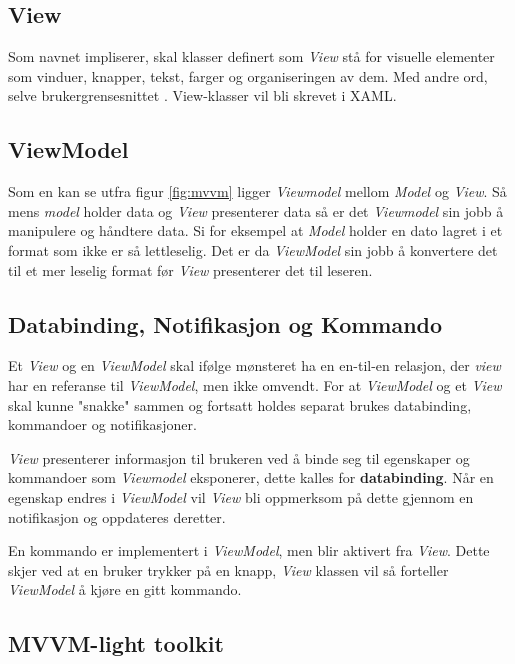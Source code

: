 \subsection{View}
 
 Som navnet impliserer, skal klasser definert som \textit{View} stå for visuelle elementer som vinduer, knapper, tekst, farger og organiseringen av dem. Med andre ord, selve brukergrensesnittet \cite{THEM6:online}. View-klasser vil bli skrevet i XAML.

 
\subsection{ViewModel}
 
 Som en kan se utfra figur \ref{fig:mvvm} ligger \textit{Viewmodel} mellom \textit{Model} og \textit{View}. Så mens \textit{model} holder data og \textit{View} presenterer data så er det \textit{Viewmodel} sin jobb å manipulere og håndtere data. Si for eksempel at \textit{Model} holder en dato lagret i et format som ikke er så lettleselig. Det er da \textit{ViewModel} sin jobb å konvertere det til et mer leselig format før \textit{View} presenterer det til leseren. 
 
\subsection{Databinding, Notifikasjon og Kommando}

Et \textit{View} og en \textit{ViewModel} skal ifølge mønsteret ha en en-til-en relasjon, der \textit{view} har en referanse til \textit{ViewModel}, men ikke omvendt. For at \textit{ViewModel} og et \textit{View} skal kunne "snakke" sammen og fortsatt holdes separat brukes databinding, kommandoer og notifikasjoner. 

\textit{View} presenterer informasjon til brukeren ved å binde seg til egenskaper og kommandoer som \textit{Viewmodel} eksponerer, dette kalles for \textbf{databinding}. Når en egenskap endres i \textit{ViewModel} vil \textit{View} bli oppmerksom på dette gjennom en notifikasjon og oppdateres deretter. 

En kommando er implementert i \textit{ViewModel}, men blir aktivert fra \textit{View}. Dette skjer ved at en bruker trykker på en knapp, \textit{View} klassen vil så forteller \textit{ViewModel} å kjøre en gitt kommando.

\subsection{MVVM-light toolkit} 
 
